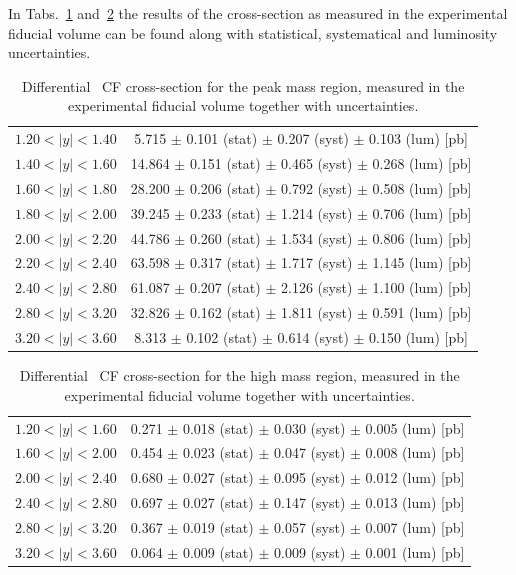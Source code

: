In Tabs.~\ref{tab:Zee_peak} and~\ref{tab:Zee_high} the results of the cross-section as measured in the experimental fiducial volume can be found along with statistical, systematical and luminosity uncertainties.

\begin{table}
\centering
\begin{tabular}{lc}
\hline
$1.20 < |y| <1.40$          & 5.715 $\pm$ 0.101 (stat) $\pm$ 0.207 (syst) $\pm$ 0.103 (lum) [pb]  \\
$1.40 < |y| <1.60$          & 14.864 $\pm$ 0.151 (stat) $\pm$ 0.465 (syst) $\pm$ 0.268 (lum) [pb]  \\
$1.60 < |y| <1.80$          & 28.200 $\pm$ 0.206 (stat) $\pm$ 0.792 (syst) $\pm$ 0.508 (lum) [pb]  \\
$1.80 < |y| <2.00$          & 39.245 $\pm$ 0.233 (stat) $\pm$ 1.214 (syst) $\pm$ 0.706 (lum) [pb]  \\
$2.00 < |y| <2.20$          & 44.786 $\pm$ 0.260 (stat) $\pm$ 1.534 (syst) $\pm$ 0.806 (lum) [pb]  \\
$2.20 < |y| <2.40$          & 63.598 $\pm$ 0.317 (stat) $\pm$ 1.717 (syst) $\pm$ 1.145 (lum) [pb]  \\
$2.40 < |y| <2.80$          & 61.087 $\pm$ 0.207 (stat) $\pm$ 2.126 (syst) $\pm$ 1.100 (lum) [pb]  \\
$2.80 < |y| <3.20$          & 32.826 $\pm$ 0.162 (stat) $\pm$ 1.811 (syst) $\pm$ 0.591 (lum) [pb]  \\
$3.20 < |y| <3.60$          & 8.313 $\pm$ 0.102 (stat) $\pm$ 0.614 (syst) $\pm$ 0.150 (lum) [pb]  \\
\hline
\end{tabular}
\caption{Differential \Zee\ CF cross-section for the peak mass region, measured in the experimental fiducial volume together with uncertainties.}
\label{tab:Zee_peak}
\end{table}

\begin{table}
\centering
\begin{tabular}{lc}
\hline
$1.20 < |y| <1.60$          & 0.271 $\pm$ 0.018 (stat) $\pm$ 0.030 (syst) $\pm$ 0.005 (lum) [pb]  \\
$1.60 < |y| <2.00$          & 0.454 $\pm$ 0.023 (stat) $\pm$ 0.047 (syst) $\pm$ 0.008 (lum) [pb]  \\
$2.00 < |y| <2.40$          & 0.680 $\pm$ 0.027 (stat) $\pm$ 0.095 (syst) $\pm$ 0.012 (lum) [pb]  \\
$2.40 < |y| <2.80$          & 0.697 $\pm$ 0.027 (stat) $\pm$ 0.147 (syst) $\pm$ 0.013 (lum) [pb]  \\
$2.80 < |y| <3.20$          & 0.367 $\pm$ 0.019 (stat) $\pm$ 0.057 (syst) $\pm$ 0.007 (lum) [pb]  \\
$3.20 < |y| <3.60$          & 0.064 $\pm$ 0.009 (stat) $\pm$ 0.009 (syst) $\pm$ 0.001 (lum) [pb]  \\
\hline
\end{tabular}
\caption{Differential \Zee\ CF cross-section for the high mass region, measured in the experimental fiducial volume together with uncertainties.}
\label{tab:Zee_high}
\end{table}

